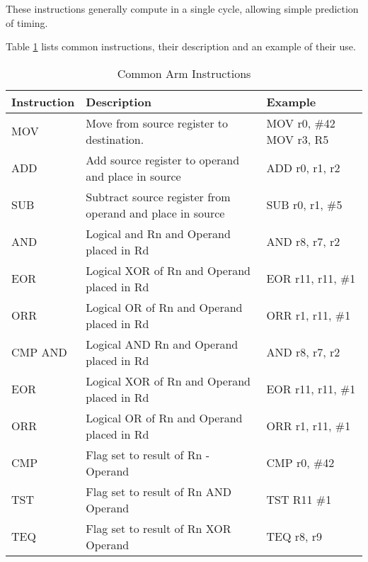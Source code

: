 				These instructions generally compute in a single cycle, allowing simple prediction of timing.

				Table \ref{tab:ARMInstructions} lists common instructions, their description and an example of their use.
				\begin{table}[htb]
					\centering
					\begin{tabular}{lp{6cm}p{3cm}}
						\toprule
						\textbf{Instruction} & \textbf{Description} & \textbf{Example} \\
						\toprule
						MOV & Move from source register to destination. & MOV r0, \#42\, MOV r3, R5 \\
						ADD & Add source register to operand and place in source & ADD r0, r1, r2 \\
						SUB & Subtract source register from operand and place in source & SUB r0, r1, \#5 \\
						AND & Logical and Rn and Operand placed in Rd & AND r8, r7, r2 \\
						EOR & Logical XOR of Rn and Operand placed in Rd & EOR r11, r11, \#1 \\
						ORR & Logical OR of Rn and Operand placed in Rd & ORR r1, r11, \#1 \\
						CMP AND & Logical AND Rn and Operand placed in Rd & AND r8, r7, r2 \\
						EOR & Logical XOR of Rn and Operand placed in Rd & EOR r11, r11, \#1 \\
						ORR & Logical OR of Rn and Operand placed in Rd & ORR r1, r11, \#1 \\
						CMP & Flag set to result of Rn - Operand & CMP r0, \#42 \\
						TST & Flag set to result of Rn AND Operand & TST R11 \#1 \\
						TEQ & Flag set to result of Rn XOR Operand & TEQ r8, r9 \\
						\bottomrule
					\end{tabular}
					\caption{Common Arm Instructions}
					\label{tab:ARMInstructions}
				\end{table}

